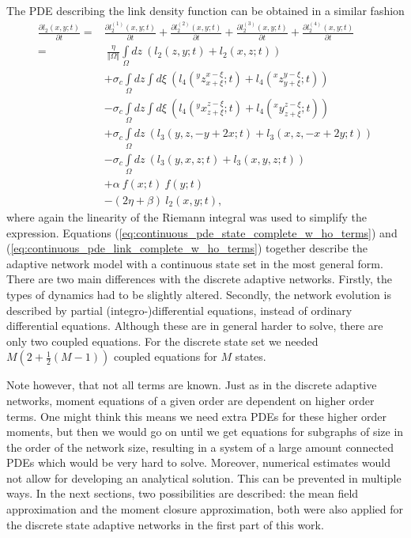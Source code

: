The PDE describing the link density function can be obtained in a similar fashion
\begin{equation}
\begin{aligned}
	\frac{\partial l_2(x,y;t)}{\partial t} 
	=& \frac{\partial l^{(1)}_2(x,y;t)}{\partial t} + \frac{\partial l^{(2)}_2(x,y;t)}{\partial t} + \frac{\partial l^{(3)}_2(x,y;t)}{\partial t} + \frac{\partial l^{(4)}_2(x,y;t)}{\partial t}\\
	=&\
	\frac{\eta}{\Vert \Omega \Vert} \int\limits_{\Omega}dz\ \left( l_2(z,y;t)   +  l_2(x,z;t) \right) \\
	&+ \sigma_c \int\limits_{\Omega} dz \int d \xi \ \left( l_4(^y z^{x-\xi}_{x+\xi};t) +  l_4(^x z^{y-\xi}_{y+\xi};t) \right)  \\
	&- \sigma_c \int\limits_{\Omega} dz \int d \xi \ \left( l_4(^y x^{z-\xi}_{z+\xi};t) +  l_4(^x y^{z-\xi}_{z+\xi};t) \right) \\
	&+ \sigma_c \int\limits_{\Omega} dz\ \left( l_3(y,z,-y+2x;t) + l_3(x,z,-x+2y;t)  \right) \\
	&- \sigma_c \int\limits_{\Omega} dz\ \left( l_3(y,x,z;t)     + l_3(x,y,z;t)      \right) \\
	&+ \alpha \ f(x;t)\ f(y;t) \\
	&- (2\eta + \beta) \ l_2(x,y;t)
	,
	\label{eq:continuous_pde_link_complete_w_ho_terms}
\end{aligned}
\end{equation}
where again the linearity of the Riemann integral was used to simplify the expression. Equations (\ref{eq:continuous_pde_state_complete_w_ho_terms}) and (\ref{eq:continuous_pde_link_complete_w_ho_terms}) together describe the adaptive network model with a continuous state set in the most general form. There are two main differences with the discrete adaptive networks. Firstly, the types of dynamics had to be slightly altered. Secondly, the network evolution is described by partial (integro-)differential equations, instead of ordinary differential equations. Although these are in general harder to solve, there are only two coupled equations. For the discrete state set we needed $M(2+\frac{1}{2}(M-1))$ coupled equations for $M$ states.

Note however, that not all terms are known. Just as in the discrete adaptive networks, moment equations of a given order are dependent on higher order terms. One might think this means we need extra PDEs for these higher order moments, but then we would go on until we get equations for subgraphs of size in the order of the network size, resulting in a system of a large amount connected PDEs which would be very hard to solve. Moreover, numerical estimates would not allow for developing an analytical solution. This can be prevented in multiple ways. In the next sections, two possibilities are described: the mean field approximation and the moment closure approximation, both were also applied for the discrete state adaptive networks in the first part of this work.  

